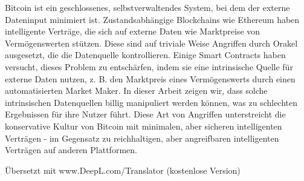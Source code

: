 Bitcoin ist ein geschlossenes, selbstverwaltendes System, bei dem der externe Dateninput minimiert ist. Zustandsabhängige Blockchains wie Ethereum haben intelligente Verträge, die sich auf externe Daten wie Marktpreise von Vermögenswerten stützen. Diese sind auf triviale Weise Angriffen durch Orakel ausgesetzt, die die Datenquelle kontrollieren. Einige Smart Contracts haben versucht, dieses Problem zu entschärfen, indem sie eine intrinsische Quelle für externe Daten nutzen, z. B. den Marktpreis eines Vermögenswerts durch einen automatisierten Market Maker. In dieser Arbeit zeigen wir, dass solche intrinsischen Datenquellen billig manipuliert werden können, was zu schlechten Ergebnissen für ihre Nutzer führt. Diese Art von Angriffen unterstreicht die konservative Kultur von Bitcoin mit minimalen, aber sicheren intelligenten Verträgen - im Gegensatz zu reichhaltigen, aber angreifbaren intelligenten Verträgen auf anderen Plattformen.

Übersetzt mit www.DeepL.com/Translator (kostenlose Version)